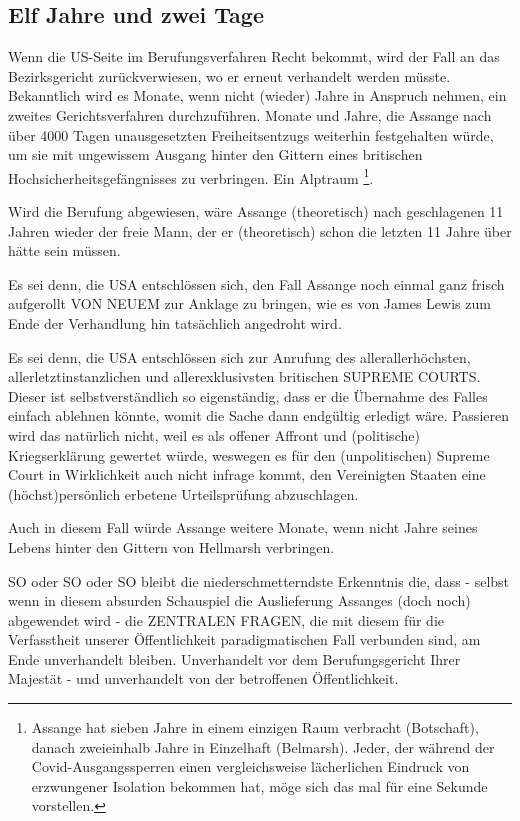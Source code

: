 \begin{multicols}{2}

\chapter{Elf Jahre und zwei Tage} %

Wenn die US-Seite im Berufungsverfahren Recht bekommt, wird der Fall an das Bezirksgericht zurückverwiesen, wo er erneut verhandelt werden müsste. Bekanntlich wird es Monate, wenn nicht (wieder) Jahre
in Anspruch nehmen, ein zweites Gerichtsverfahren
durchzuführen. Monate und Jahre, die Assange nach
über 4000 Tagen unausgesetzten Freiheitsentzugs weiterhin festgehalten würde, um sie mit ungewissem Ausgang hinter den Gittern eines britischen Hochsicherheitsgefängnisses zu verbringen. Ein Alptraum \footnote[23]{Assange hat sieben Jahre in einem einzigen Raum verbracht (Botschaft), danach zweieinhalb Jahre in Einzelhaft (Belmarsh). Jeder, der während der Covid-Ausgangssperren einen vergleichsweise lächerlichen Eindruck
von erzwungener Isolation bekommen hat, möge sich das mal für eine Sekunde vorstellen.}.

Wird die Berufung abgewiesen, wäre Assange (theoretisch) nach geschlagenen 11 Jahren wieder der freie
Mann, der er (theoretisch) schon die letzten 11 Jahre
über hätte sein müssen.

Es sei denn, die USA entschlössen sich, den Fall Assange
noch einmal ganz frisch aufgerollt VON NEUEM zur Anklage zu bringen, wie es von James Lewis zum Ende der
Verhandlung hin tatsächlich angedroht wird.

Es sei denn, die USA entschlössen sich zur Anrufung
des allerallerhöchsten, allerletztinstanzlichen und allerexklusivsten britischen SUPREME COURTS. Dieser ist
selbstverständlich so eigenständig, dass er die Übernahme des Falles einfach ablehnen könnte, womit die
Sache dann endgültig erledigt wäre. Passieren wird das
natürlich nicht, weil es als offener Affront und (politische) Kriegserklärung gewertet würde, weswegen es
für den (unpolitischen) Supreme Court in Wirklichkeit
auch nicht infrage kommt, den Vereinigten Staaten eine
(höchst)persönlich erbetene Urteilsprüfung abzuschlagen.

Auch in diesem Fall würde Assange weitere Monate,
wenn nicht Jahre seines Lebens hinter den Gittern von
Hellmarsh verbringen.

SO oder SO oder SO bleibt die niederschmetterndste
Erkenntnis die, dass - selbst wenn in diesem absurden
Schauspiel die Auslieferung Assanges (doch noch) abgewendet wird - die ZENTRALEN FRAGEN, die mit diesem für die Verfasstheit unserer Öffentlichkeit paradigmatischen Fall verbunden sind, am Ende unverhandelt
bleiben. Unverhandelt vor dem Berufungsgericht Ihrer
Majestät - und unverhandelt von der betroffenen Öffentlichkeit.


\end{multicols}
